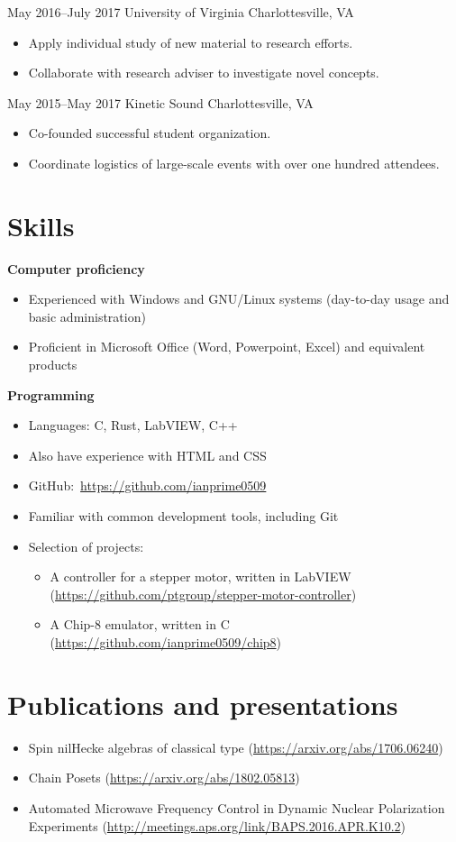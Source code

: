 \documentclass[10pt]{article}
\begin{document}
{May 2016--July 2017}
{University of Virginia}
{Charlottesville, VA}
\begin{itemize}
\item Apply individual study of new material to research efforts.
\item Collaborate with research adviser to investigate novel concepts.
\end{itemize}

{May 2015--May 2017}
{Kinetic Sound}
{Charlottesville, VA}
\begin{itemize}
\item Co-founded successful student organization.
\item Coordinate logistics of large-scale events with over one hundred attendees.
\end{itemize}

\section*{Skills}
\textbf{Computer proficiency}
\begin{itemize}
\item Experienced with Windows and GNU/Linux systems (day-to-day usage and
  basic administration)
\item Proficient in Microsoft Office (Word, Powerpoint, Excel) and equivalent
  products
\end{itemize}
\textbf{Programming}
\begin{itemize}
\item Languages: C, Rust, LabVIEW, C++
\item Also have experience with HTML and CSS
\item GitHub:~\url{https://github.com/ianprime0509}
\item Familiar with common development tools, including Git
\item Selection of projects:
  \begin{itemize}
  \item A controller for a stepper motor, written in LabVIEW
    (\url{https://github.com/ptgroup/stepper-motor-controller})
  \item A Chip-8 emulator, written in C
    (\url{https://github.com/ianprime0509/chip8})
  \end{itemize}
\end{itemize}

\section*{Publications and presentations}
\begin{itemize}
\item Spin nilHecke algebras of classical type
  (\url{https://arxiv.org/abs/1706.06240})
\item Chain Posets (\url{https://arxiv.org/abs/1802.05813})
\item Automated Microwave Frequency Control in Dynamic Nuclear Polarization
  Experiments (\url{http://meetings.aps.org/link/BAPS.2016.APR.K10.2})
\end{itemize}
\end{document}
